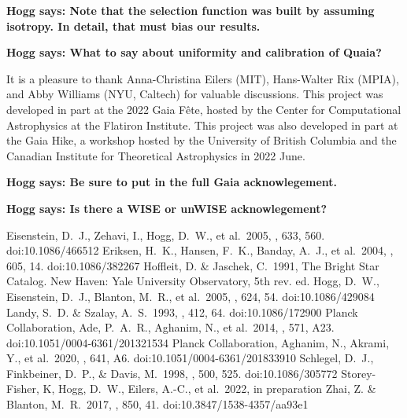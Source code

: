 \documentclass[modern]{aastex631}
\newcommand{\hogg}[1]{\textbf{Hogg says: #1}}
\begin{document}
\hogg{Note that the selection function was built by assuming isotropy. In detail, that must bias our results.}

\hogg{What to say about uniformity and calibration of Quaia?}

\begin{acknowledgements}
It is a pleasure to thank
  Anna-Christina Eilers (MIT),
  Hans-Walter Rix (MPIA), and
  Abby Williams (NYU, Caltech)
for valuable discussions.
This project was developed in part at the 2022 Gaia F\^ete, hosted by the Center for Computational Astrophysics at the Flatiron Institute.
This project was also developed in part at the Gaia Hike, a workshop hosted by the University of British Columbia and the Canadian Institute for Theoretical Astrophysics in 2022 June.

\hogg{Be sure to put in the full Gaia acknowlegement.}

\hogg{Is there a WISE or unWISE acknowlegement?}
\end{acknowledgements}



\begin{thebibliography}{dummy}
 Eisenstein, D.~J., Zehavi, I., Hogg, D.~W., et al.\ 2005, \apj, 633, 560. doi:10.1086/466512
 Eriksen, H.~K., Hansen, F.~K., Banday, A.~J., et al.\ 2004, \apj, 605, 14. doi:10.1086/382267
Hoffleit, D. \& Jaschek, C.\ 1991, The Bright Star Catalog. New Haven: Yale University Observatory, 5th rev. ed.
 Hogg, D.~W., Eisenstein, D.~J., Blanton, M.~R., et al.\ 2005, \apj, 624, 54. doi:10.1086/429084
 Landy, S.~D. \& Szalay, A.~S.\ 1993, \apj, 412, 64. doi:10.1086/172900
 Planck Collaboration, Ade, P.~A.~R., Aghanim, N., et al.\ 2014, \aap, 571, A23. doi:10.1051/0004-6361/201321534
 Planck Collaboration, Aghanim, N., Akrami, Y., et al.\ 2020, \aap, 641, A6. doi:10.1051/0004-6361/201833910
 Schlegel, D.~J., Finkbeiner, D.~P., \& Davis, M.\ 1998, \apj, 500, 525. doi:10.1086/305772
 Storey-Fisher, K, Hogg, D.~W., Eilers, A.-C., et al.\ 2022, in preparation
 Zhai, Z. \& Blanton, M.~R.\ 2017, \apj, 850, 41. doi:10.3847/1538-4357/aa93e1
\end{thebibliography}
\end{document}
